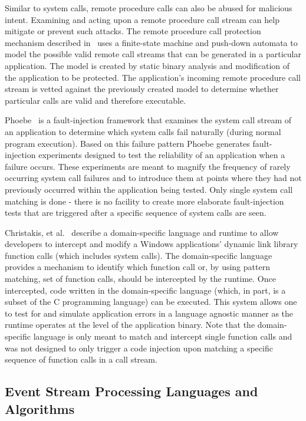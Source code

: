 Similar to system calls, remote procedure calls can also be abused for malicious
intent. Examining and acting upon a remote procedure call stream can help
mitigate or prevent such attacks. The remote procedure call protection mechanism
described in~\cite{DBLP:conf/uss/GiffinJM02} uses a finite-state machine and push-down automata
to model the possible valid remote call streams that can be generated in a
particular application. The model is created by static binary analysis
and modification of the application to be protected. The application's incoming
remote procedure call stream is vetted against the previously created model to
determine whether particular calls are valid and therefore
executable.

Phoebe~\cite{DBLP:journals/corr/abs-2006-04444} is a fault-injection framework that examines
the system call stream of an application to determine which system calls fail
naturally (during normal program execution). Based on this failure pattern
Phoebe generates fault-injection experiments designed to test the reliability of
an application when a failure occurs. These experiments are meant to magnify the
frequency of rarely occurring system call failures and to introduce them at
points where they had not previously occurred within the application being
tested. Only single system call matching is done - there is no facility to create
more elaborate fault-injection tests that are triggered after a specific
sequence of system calls are seen.

Christakis, et al.~\cite{DBLP:conf/icse/ChristakisEG017} describe a domain-specific language and runtime to allow developers to intercept and modify a Windows applications’ dynamic link library function calls (which includes system calls). The domain-specific language provides a mechanism to identify which function call or, by using pattern matching, set of function calls, should be intercepted by the runtime. Once intercepted, code written in the domain-specific language (which, in part, is a subset of the C programming language) can be executed. This system allows one to test for and simulate application errors in a language agnostic manner as the runtime operates at the level of the application binary. Note that the domain-specific language is only meant to match and intercept single function calls and was not designed to only trigger a code injection upon matching a specific sequence of function calls in a call stream. 

\subsection{Event Stream Processing Languages and Algorithms}

